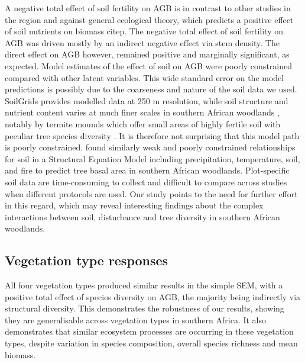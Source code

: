 \documentclass[11pt,a4paper]{article}
\begin{document}
A negative total effect of soil fertility on AGB is in contrast to other studies in the region and against general ecological theory, which predicts a positive effect of soil nutrients on biomass citep{}. The negative total effect of soil fertility on AGB was driven mostly by an indirect negative effect via stem density. The direct effect on AGB however, remained positive and marginally significant, as expected. Model estimates of the effect of soil on AGB were poorly constrained compared with other latent variables. This wide standard error on the model predictions is possibly due to the coarseness and nature of the soil data we used. SoilGrids provides modelled data at 250 m resolution, while soil structure and nutrient content varies at much finer scales in southern African woodlands \citep{Muledi2017, Bucini2007}, notably by termite mounds which offer small areas of highly fertile soil with peculiar tree species diversity \citep{Joseph2014}. It is therefore not surprising that this model path is poorly constrained. \citet{Lehmann2014} found similarly weak and poorly constrained relationships for soil in a Structural Equation Model including precipitation, temperature, soil, and fire to predict tree basal area in southern African woodlands. Plot-specific soil data are time-consuming to collect and difficult to compare across studies when different protocols are used. Our study points to the need for further effort in this regard, which may reveal interesting findings about the complex interactions between soil, disturbance and tree diversity in southern African woodlands.

\subsection{Vegetation type responses}

All four vegetation types produced similar results in the simple SEM, with a positive total effect of species diversity on AGB, the majority being indirectly via structural diversity. This demonstrates the robustness of our results, showing they are generalisable across vegetation types in southern Africa. It also demonstrates that similar ecosystem processes are occurring in these vegetation types, despite variation in species composition, overall species richness and mean biomass.
\end{document}
